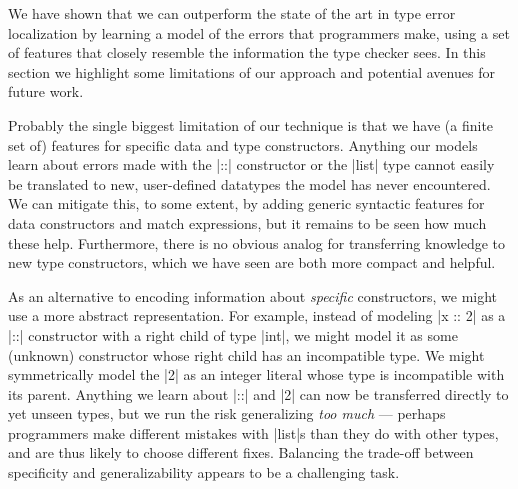 \label{sec:discussion}

We have shown that we can outperform the state of the art in type error
localization by learning a model of the errors that programmers make,
using a set of features that closely resemble the information the type
checker sees.
%
%
In this section we highlight some limitations of our approach and
potential avenues for future work.


Probably the single biggest limitation of our technique is that we have
(a finite set of) features for specific data and type constructors.
%
Anything our models learn about errors made with the |::| constructor or
the |list| type cannot easily be translated to new, user-defined
datatypes the model has never encountered.
%
We can mitigate this, to some extent, by adding generic
syntactic features for data constructors and match expressions, but it
remains to be seen how much these help. %
%
Furthermore, there is no obvious analog for transferring knowledge to
new type constructors, which we have seen are both more compact and
helpful.

As an alternative to encoding information about \emph{specific}
constructors, we might use a more abstract representation.
%
For example, instead of modeling |x :: 2| as a |::| constructor with a
right child of type |int|, we might model it as some (unknown) constructor
whose right child has an incompatible type.
%
We might symmetrically model the |2| as an integer literal whose type is
incompatible with its parent.
%
Anything we learn about |::| and |2| can now be transferred directly to
yet unseen types, but we run the risk generalizing \emph{too much} ---
\ie perhaps programmers make different mistakes with |list|s than they
do with other types, and are thus likely to choose different fixes.
%
Balancing the trade-off between specificity and generalizability appears
to be a challenging task.



